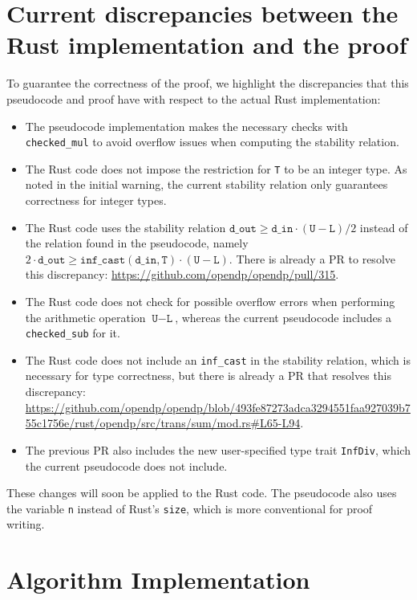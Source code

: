 \documentclass[11pt,a4paper]{article}
\theoremstyle{definition}
\newcommand{\din}{\texttt{d\_in}}
\newcommand{\dout}{\texttt{d\_out}}
\begin{document}
\section{Current discrepancies between the Rust implementation and the proof}

To guarantee the correctness of the proof, we highlight the discrepancies that this pseudocode and proof have with respect to the actual Rust implementation:
\begin{itemize}
    \item The pseudocode implementation makes the necessary checks with \texttt{checked\_mul} to avoid overflow issues when computing the stability relation. 
    \item The Rust code does not impose the restriction for \texttt{T} to be an integer type. As noted in the initial warning, the current stability relation only guarantees correctness for integer types.
    \item The Rust code uses the stability relation $\dout \geq \din \cdot (\texttt{U}-\texttt{L})/2$ instead of the relation found in the pseudocode, namely $2\cdot \dout \geq \texttt{inf\_cast}(\din, \texttt{T})\cdot (\texttt{U}-\texttt{L})$. There is already a PR to resolve this discrepancy: \url{https://github.com/opendp/opendp/pull/315}.
    \item The Rust code does not check for possible overflow errors when performing the arithmetic operation $\texttt{U}-\texttt{L}$, whereas the current pseudocode includes a \texttt{checked\_sub} for it.
    \item The Rust code does not include an \texttt{inf\_cast} in the stability relation, which is necessary for type correctness, but there is already a PR that resolves this discrepancy: \url{https://github.com/opendp/opendp/blob/493fe87273adca3294551faa927039b755c1756e/rust/opendp/src/trans/sum/mod.rs#L65-L94}.
    \item The previous PR also includes the new user-specified type trait \texttt{InfDiv}, which the current pseudocode does not include.
\end{itemize}

These changes will soon be applied to the Rust code. The pseudocode also uses the variable \texttt{n} instead of Rust's \texttt{size}, which is more conventional for proof writing.


\section{Algorithm Implementation}
\end{document}
